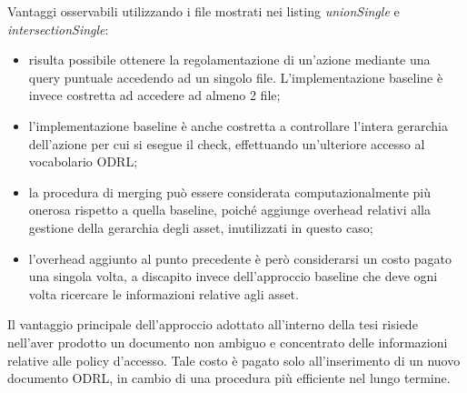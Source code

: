 \documentclass[12pt,a4paper,twoside]{book}
\begin{document}
Vantaggi osservabili utilizzando i file mostrati nei listing \textit{unionSingle} e \textit{intersectionSingle}:
\begin{itemize}
\item risulta possibile ottenere la regolamentazione di un'azione mediante una query puntuale accedendo ad un singolo file. L'implementazione baseline è invece costretta ad accedere ad almeno 2 file;
\item l'implementazione baseline è anche costretta a controllare l'intera gerarchia dell'azione per cui si esegue il check, effettuando un'ulteriore accesso al vocabolario ODRL;
\item la procedura di merging può essere considerata computazionalmente più onerosa rispetto a quella baseline, poiché aggiunge overhead relativi alla gestione della gerarchia degli asset, inutilizzati in questo caso;
\item l'overhead aggiunto al punto precedente è però considerarsi un costo pagato una singola volta, a discapito invece dell'approccio baseline che deve ogni volta ricercare le informazioni relative agli asset.
\end{itemize}
Il vantaggio principale dell'approccio adottato all'interno della tesi risiede nell'aver prodotto un documento non ambiguo e concentrato delle informazioni relative alle policy d'accesso. Tale costo è pagato solo all'inserimento di un nuovo documento ODRL, in cambio di una procedura più efficiente nel lungo termine.
\end{document}
